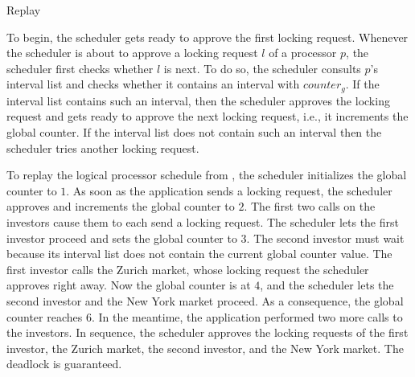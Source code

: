 \begin{algorithm}[!ht]

\caption{Replay\label{alg:replay}}
\end{algorithm}

To begin, the scheduler gets ready to approve the first locking request.
Whenever the scheduler is about to approve a locking request $l$ of a processor $p$, the scheduler first checks whether $l$ is next. To do so, the scheduler consults $p$'s interval list and checks whether it contains an interval with $counter_{g}$. If the interval list contains such an interval, then the scheduler approves the locking request and gets ready to approve the next locking request, i.e., it increments the global counter. If the interval list does not contain such an interval then the scheduler tries another locking request.

To replay the logical processor schedule from , the scheduler initializes the global counter to $1$. As soon as the application sends a locking request, the scheduler approves and increments the global counter to $2$. The first two calls on the investors cause them to each send a locking request. The scheduler lets the first investor proceed and sets the global counter to $3$. The second investor must wait because its interval list does not contain the current global counter value. The first investor calls the Zurich market, whose locking request the scheduler approves right away. Now the global counter is at $4$, and the scheduler lets the second investor and the New York market proceed. As a consequence, the global counter reaches $6$. In the meantime, the application performed two more calls to the investors. In sequence, the scheduler approves the locking requests of the first investor, the Zurich market, the second investor, and the New York market. The deadlock is guaranteed.
